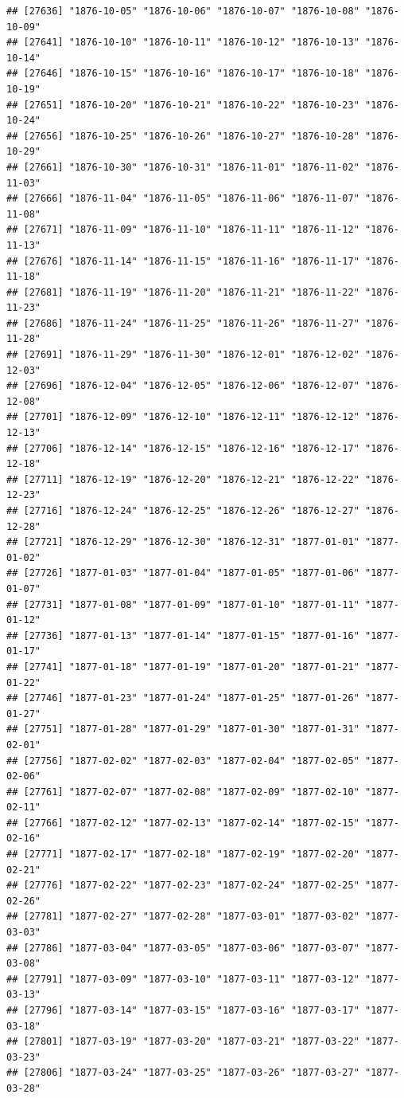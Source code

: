 \documentclass{article}\usepackage[]{graphicx}\usepackage[]{color}
\makeatletter
\newenvironment{kframe}{%
 \def\at@end@of@kframe{}%
 \ifinner\ifhmode%
  \def\at@end@of@kframe{\end{minipage}}%
  \begin{minipage}{\columnwidth}%
 \fi\fi%
 \def\FrameCommand##1{\hskip\@totalleftmargin \hskip-\fboxsep
 \colorbox{shadecolor}{##1}\hskip-\fboxsep
     \hskip-\linewidth \hskip-\@totalleftmargin \hskip\columnwidth}%
 \MakeFramed {\advance\hsize-\width
   \@totalleftmargin\z@ \linewidth\hsize
   \@setminipage}}%
 {\par\unskip\endMakeFramed%
 \at@end@of@kframe}
\newenvironment{knitrout}{}{} %
\makeatother
\begin{document}
\begin{description}
\begin{knitrout}
\begin{kframe}
\begin{verbatim}
## [27636] "1876-10-05" "1876-10-06" "1876-10-07" "1876-10-08" "1876-10-09"
## [27641] "1876-10-10" "1876-10-11" "1876-10-12" "1876-10-13" "1876-10-14"
## [27646] "1876-10-15" "1876-10-16" "1876-10-17" "1876-10-18" "1876-10-19"
## [27651] "1876-10-20" "1876-10-21" "1876-10-22" "1876-10-23" "1876-10-24"
## [27656] "1876-10-25" "1876-10-26" "1876-10-27" "1876-10-28" "1876-10-29"
## [27661] "1876-10-30" "1876-10-31" "1876-11-01" "1876-11-02" "1876-11-03"
## [27666] "1876-11-04" "1876-11-05" "1876-11-06" "1876-11-07" "1876-11-08"
## [27671] "1876-11-09" "1876-11-10" "1876-11-11" "1876-11-12" "1876-11-13"
## [27676] "1876-11-14" "1876-11-15" "1876-11-16" "1876-11-17" "1876-11-18"
## [27681] "1876-11-19" "1876-11-20" "1876-11-21" "1876-11-22" "1876-11-23"
## [27686] "1876-11-24" "1876-11-25" "1876-11-26" "1876-11-27" "1876-11-28"
## [27691] "1876-11-29" "1876-11-30" "1876-12-01" "1876-12-02" "1876-12-03"
## [27696] "1876-12-04" "1876-12-05" "1876-12-06" "1876-12-07" "1876-12-08"
## [27701] "1876-12-09" "1876-12-10" "1876-12-11" "1876-12-12" "1876-12-13"
## [27706] "1876-12-14" "1876-12-15" "1876-12-16" "1876-12-17" "1876-12-18"
## [27711] "1876-12-19" "1876-12-20" "1876-12-21" "1876-12-22" "1876-12-23"
## [27716] "1876-12-24" "1876-12-25" "1876-12-26" "1876-12-27" "1876-12-28"
## [27721] "1876-12-29" "1876-12-30" "1876-12-31" "1877-01-01" "1877-01-02"
## [27726] "1877-01-03" "1877-01-04" "1877-01-05" "1877-01-06" "1877-01-07"
## [27731] "1877-01-08" "1877-01-09" "1877-01-10" "1877-01-11" "1877-01-12"
## [27736] "1877-01-13" "1877-01-14" "1877-01-15" "1877-01-16" "1877-01-17"
## [27741] "1877-01-18" "1877-01-19" "1877-01-20" "1877-01-21" "1877-01-22"
## [27746] "1877-01-23" "1877-01-24" "1877-01-25" "1877-01-26" "1877-01-27"
## [27751] "1877-01-28" "1877-01-29" "1877-01-30" "1877-01-31" "1877-02-01"
## [27756] "1877-02-02" "1877-02-03" "1877-02-04" "1877-02-05" "1877-02-06"
## [27761] "1877-02-07" "1877-02-08" "1877-02-09" "1877-02-10" "1877-02-11"
## [27766] "1877-02-12" "1877-02-13" "1877-02-14" "1877-02-15" "1877-02-16"
## [27771] "1877-02-17" "1877-02-18" "1877-02-19" "1877-02-20" "1877-02-21"
## [27776] "1877-02-22" "1877-02-23" "1877-02-24" "1877-02-25" "1877-02-26"
## [27781] "1877-02-27" "1877-02-28" "1877-03-01" "1877-03-02" "1877-03-03"
## [27786] "1877-03-04" "1877-03-05" "1877-03-06" "1877-03-07" "1877-03-08"
## [27791] "1877-03-09" "1877-03-10" "1877-03-11" "1877-03-12" "1877-03-13"
## [27796] "1877-03-14" "1877-03-15" "1877-03-16" "1877-03-17" "1877-03-18"
## [27801] "1877-03-19" "1877-03-20" "1877-03-21" "1877-03-22" "1877-03-23"
## [27806] "1877-03-24" "1877-03-25" "1877-03-26" "1877-03-27" "1877-03-28"

\end{verbatim}
\end{kframe}
\end{knitrout}
\end{description}
\end{document}
